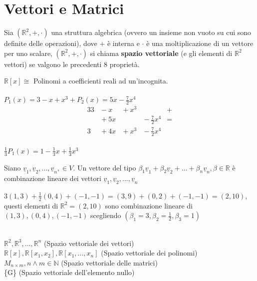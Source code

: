 \chapter{Vettori e Matrici}

Sia $(\mathbb{R}^{2},+,\cdot)$ una struttura algebrica (ovvero un insieme non vuoto su cui sono definite delle operazioni), dove $+$ è interna e $\cdot$ è una moltiplicazione di un vettore per uno scalare, $(\mathbb{R}^{2},+,\cdot)$ si chiama \textbf{spazio vettoriale} (e gli elementi di $\mathbb{R}^{2}$ vettori) se valgono le precedenti 8 proprietà.

\begin{es}
	$\mathbb{R}[x] \cong$ Polinomi a coefficienti reali ad un'incognita.\\\\
	$P_{1}(x)=3-x+x^{3} + P_{2}(x)=5x-\frac{7}{2}x^{4}$
	\begin{alignat*}{3}
		3 &{}- x&{}+ x^{3}&  &{}+\\
		  &{}+ 5x&{} &{}- \frac{7}{2}x^{4}&{}=\\
		3 &{}+ 4x&{}+ x^{3}&{}- \frac{7}{2}x^{4}& 
	\end{alignat*}\\
	$\frac{1}{3}P_{1}(x)=1-\frac{1}{3}x+\frac{1}{3}x^{3}$
\end{es}

\begin{definizione}
	Siano $\underline{v}_{1},\underline{v}_{2},...,\underline{v}_{n}, \in V$. Un vettore del tipo $\beta_1 \underline{v} _1+\beta_2 \underline{v} _2+...+\beta_n \underline{v} _n, \beta\in \mathbb{R}$ è combinazione lineare dei vettori $\underline{v} _{1},\underline{v} _{2},...,\underline{v} _{n}$
	\begin{es}
		$3(1,3)+\frac{1}{2}(0,4)+(-1,-1)=(3,9)+(0,2)+(-1,-1)=(2,10)$, questi elementi di $\mathbb{R}^2=(2,10)$ sono combinazione lineare di $(1,3),(0,4),(-1,-1)$ scegliendo $(\beta_1=3, \beta_2=\frac{1}{2}, \beta_3=1)$
	\end{es}
\end{definizione}

\begin{es}
	\phantom{}\\
    $\mathbb{R}^2, \mathbb{R}^3,...,\mathbb{R}^n$ (Spazio vettoriale dei vettori)\\
    $\mathbb{R}[x], \mathbb{R}[x_1,x_2], \mathbb{R}[x_1,...,x_n]$ (Spazio vettoriale dei polinomi)\\
    $M_{n\times m}, n\wedge m\in \mathbb{N}$ (Spazio vettoriale delle matrici)\\
    \{G\} (Spazio vettoriale dell'elemento nullo)
\end{es}

